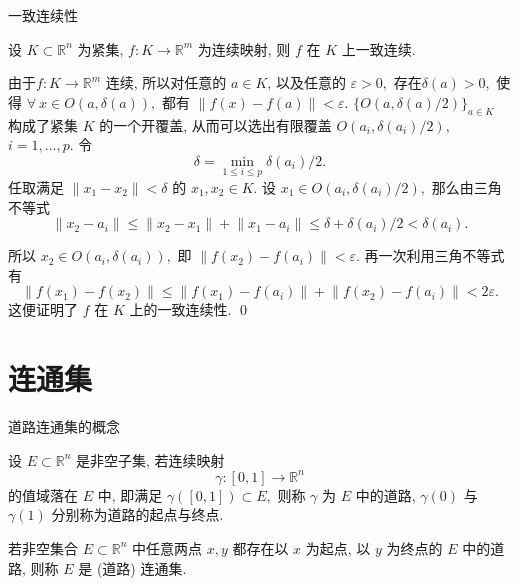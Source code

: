 \begin{frame}{一致连续性}

\begin{thm}
设 $K \subset \mathbb{R}^n$ 为紧集, $f: K \to \mathbb{R}^m$ 为连续映射, 则 $f$ 在 $K$ 上一致连续.
\end{thm}

\pause
\vspace{1em}

由于$f: K \to \mathbb{R}^m$ 连续, 所以对任意的 $a \in K$, 以及任意的 $\varepsilon > 0,$ 存在$\delta(a) > 0,$ 使得 $\forall~x \in O(a, \delta(a)),$ 都有 $\lVert f(x) - f(a) \rVert < \varepsilon.$ $\{ O(a, \delta(a)/2) \}_{a \in K}$ 构成了紧集 $K$ 的一个开覆盖, 从而可以选出有限覆盖 $O(a_i, \delta(a_i)/2),$ $i = 1, \dots, p.$
\pause
令
\[\delta = \min\limits_{1\leqslant i \leqslant p} \delta(a_i) / 2.\]
任取满足 $\lVert x_1 - x_2 \rVert < \delta$ 的 $x_1, x_2 \in K.$ 设 $x_1 \in O(a_i, \delta(a_i)/2),$ 那么由三角不等式
\[\lVert x_2 - a_i \rVert \leqslant \lVert x_2 - x_1 \rVert + \lVert x_1 - a_i \rVert \leqslant \delta + \delta(a_i)/2 < \delta(a_i).\]

\pause

所以 $x_2 \in O(a_i, \delta(a_i)),$ 即 $\lVert f(x_2) - f(a_i) \rVert < \varepsilon.$ 再一次利用三角不等式有
\[\lVert f(x_1) - f(x_2) \rVert \leqslant \lVert f(x_1) - f(a_i) \rVert + \lVert f(x_2) - f(a_i) \rVert < 2\varepsilon.\]
这便证明了 $f$ 在 $K$ 上的一致连续性.
\qed

\end{frame}


\section{连通集}


\begin{frame}{道路连通集的概念}

\begin{Def}[道路连通集]
设 $E \subset \mathbb{R}^n$ 是非空子集, 若连续映射
\[\gamma: [0, 1] \longrightarrow \mathbb{R}^n\]
的值域落在 $E$ 中, 即满足 $\gamma([0, 1]) \subset E,$ 则称 $\gamma$ 为 $E$ 中的道路, $\gamma(0)$ 与 $\gamma(1)$ 分别称为道路的起点与终点.

\pause
\vspace{1em}

若非空集合 $E \subset \mathbb{R}^n$ 中任意两点 $x, y$ 都存在以 $x$ 为起点, 以 $y$ 为终点的 $E$ 中的道路, 则称 $E$ 是 (道路) 连通集.
\end{Def}

\end{frame}

